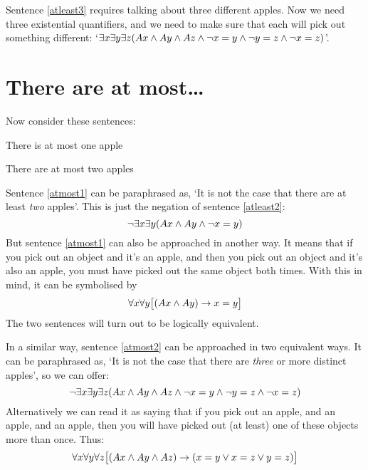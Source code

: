 Sentence \ref{atleast3} requires talking about three different apples. Now we need three existential quantifiers, and we need to make sure that each will pick out something different: `$\exists x \exists y\exists z(Ax \wedge Ay \wedge Az \wedge \neg x = y \wedge \neg y = z \wedge \neg x = z)$'.

\section{There are at most\ldots}
Now consider these sentences:
\begin{earg}
	\item[\ex{atmost1}] There is at most one apple
	\item[\ex{atmost2}] There are at most two apples
\end{earg}
Sentence \ref{atmost1} can be paraphrased as, `It is not the case that there are at least \emph{two} apples'. This is just the negation of sentence \ref{atleast2}: 
$$\neg \exists x \exists y(Ax \wedge Ay \wedge \neg x = y)$$
But sentence \ref{atmost1} can also be approached in another way. It means that if you pick out an object and it's an apple, and then you pick out an object and it's also an apple, you must have picked out the same object both times. With this in mind, it can be symbolised by
$$\forall x\forall y\bigl[(Ax \wedge Ay) \rightarrow x=y\bigr]$$
The two sentences will turn out to be logically equivalent.

In a similar way, sentence \ref{atmost2} can be approached in two equivalent ways. It can be paraphrased as, `It is not the case that there are \emph{three} or more distinct apples', so we can offer:
$$\neg \exists x \exists y\exists z(Ax \wedge Ay \wedge Az \wedge \neg x = y \wedge \neg y = z \wedge \neg x = z)$$
Alternatively we can read it as saying that if you pick out an apple, and an apple, and an apple, then you will have picked out (at least) one of these objects more than once. Thus:
$$\forall x\forall y\forall z\bigl[(Ax \wedge Ay \wedge Az) \rightarrow (x=y \vee x=z \vee y=z)\bigr]$$


